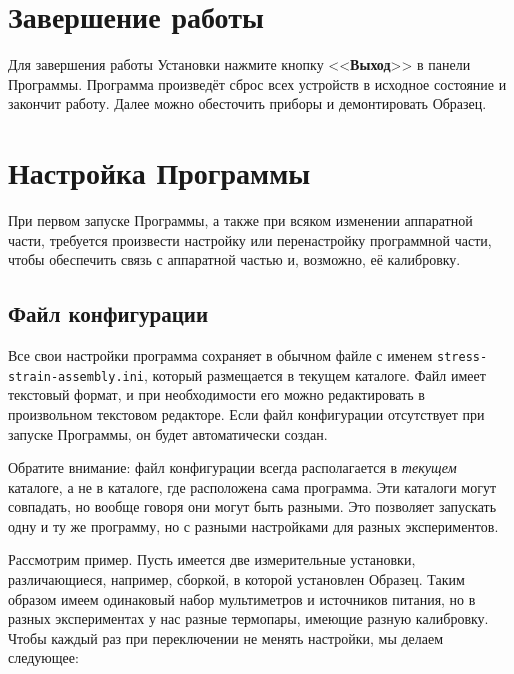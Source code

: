\documentclass[12pt, a4paper, twocolumn]{report}
\newcommand{\PROGNAME}{stress-strain-assembly}
\newcommand{\CTL}[1]{<<{\bf #1}>>}
\newcommand{\FILENAME}[1]{{\tt #1}}
\begin{document}
\chapter{Завершение работы}

Для завершения работы Установки нажмите кнопку \CTL{Выход} в панели Программы. Программа произведёт сброс всех устройств в исходное состояние и закончит работу. Далее можно обесточить приборы и демонтировать Образец.

\chapter{Настройка Программы}

При первом запуске Программы, а также при всяком изменении аппаратной части, требуется произвести настройку или перенастройку программной части, чтобы обеспечить связь с аппаратной частью и, возможно, её калибровку.

\section{Файл конфигурации}

Все свои настройки программа сохраняет в обычном файле с именем \FILENAME{\PROGNAME{}.ini}, который размещается в текущем каталоге. Файл имеет текстовый формат, и при необходимости его можно редактировать в произвольном текстовом редакторе. Если файл конфигурации отсутствует при запуске Программы, он будет автоматически создан.

Обратите внимание: файл конфигурации всегда располагается в {\it текущем} каталоге, а не в каталоге, где расположена сама программа. Эти каталоги могут совпадать, но вообще говоря они могут быть разными. Это позволяет запускать одну и ту же программу, но с разными настройками для разных экспериментов.

Рассмотрим пример. Пусть имеется две измерительные установки, различающиеся, например, сборкой, в которой установлен Образец. Таким образом имеем одинаковый набор мультиметров и источников питания, но в разных экспериментах у нас разные термопары, имеющие разную калибровку. Чтобы каждый раз при переключении не менять настройки, мы делаем следующее:
\end{document}
